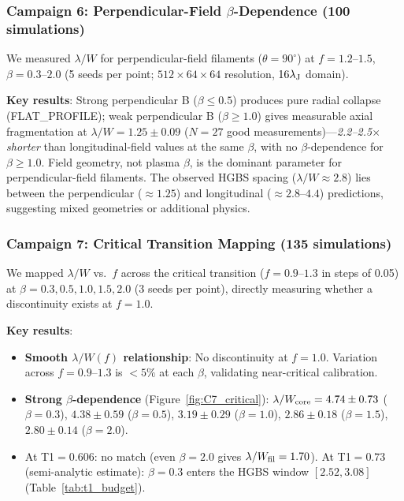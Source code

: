 \documentclass[twoside,twocolumn]{mnras}
\begin{document}
\subsubsection{Campaign 6: Perpendicular-Field $\beta$-Dependence (100 simulations)}

We measured $\lambda/W$ for perpendicular-field filaments ($\theta = 90^\circ$) at
$f = 1.2$--$1.5$, $\beta = 0.3$--$2.0$ (5 seeds per point; $512\times64\times64$ resolution,
$16\lambda_{\rm J}$ domain).

\textbf{Key results}: Strong perpendicular B ($\beta \leq 0.5$) produces pure radial collapse
(FLAT\_PROFILE); weak perpendicular B ($\beta \geq 1.0$) gives measurable axial fragmentation
at $\lambda/W = 1.25 \pm 0.09$ ($N = 27$ good measurements)---\textit{2.2--2.5$\times$
shorter} than longitudinal-field values at the same $\beta$, with no $\beta$-dependence
for $\beta \geq 1.0$. Field geometry, not plasma $\beta$, is the dominant parameter for
perpendicular-field filaments. The observed HGBS spacing ($\lambda/W \approx 2.8$) lies
between the perpendicular (${\approx}1.25$) and longitudinal (${\approx}2.8$--$4.4$)
predictions, suggesting mixed geometries or additional physics.

\subsubsection{Campaign 7: Critical Transition Mapping (135 simulations)}

We mapped $\lambda/W$ vs.\ $f$ across the critical transition ($f = 0.9$--$1.3$ in
steps of 0.05) at $\beta = 0.3, 0.5, 1.0, 1.5, 2.0$ (3 seeds per point), directly
measuring whether a discontinuity exists at $f = 1.0$.

\textbf{Key results}:
\begin{itemize}
    \item \textbf{Smooth $\lambda/W(f)$ relationship}: No discontinuity at $f = 1.0$.
    Variation across $f = 0.9$--$1.3$ is $<5\%$ at each $\beta$, validating
    near-critical calibration.
    \item \textbf{Strong $\beta$-dependence} (Figure~\ref{fig:C7_critical}):
    $\lambda/W_{\rm core} = 4.74 \pm 0.73$ ($\beta = 0.3$), $4.38 \pm 0.59$ ($\beta = 0.5$),
    $3.19 \pm 0.29$ ($\beta = 1.0$), $2.86 \pm 0.18$ ($\beta = 1.5$),
    $2.80 \pm 0.14$ ($\beta = 2.0$).
    \item At T1$=0.606$: no match (even $\beta=2.0$ gives $\lambda/W_{\rm fil}=1.70$). At T1$=0.73$ (semi-analytic estimate): $\beta=0.3$ enters the HGBS window $[2.52, 3.08]$ (Table~\ref{tab:t1_budget}).
\end{itemize}
\end{document}

